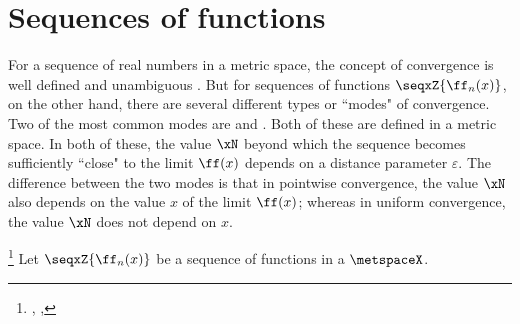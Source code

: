\section{Sequences of functions}
For a sequence of real numbers in a metric space, the concept of convergence is well defined and unambiguous
.
But for sequences of functions $\seqxZ{\ff_n(x)}$, on the other hand, there are several different types or ``modes" of convergence.
Two of the most common modes are   and  . 
Both of these are defined in a metric space.
In both of these, the value $\xN$ beyond which the sequence becomes sufficiently ``close" 
to the limit $\ff(x)$ depends on a distance parameter $\varepsilon$.
The difference between the two modes is that in pointwise convergence, the value $\xN$ also depends on the value $x$ of 
the limit $\ff(x)$;
whereas in uniform convergence, the value $\xN$ does not depend on $x$.

\begin{definition}
\footnote{
  ,
  ,
  }
\label{def:conpnt}
Let $\seqxZ{\ff_n(x)}$ be a sequence of functions in a  $\metspaceX$. 
\end{definition}

